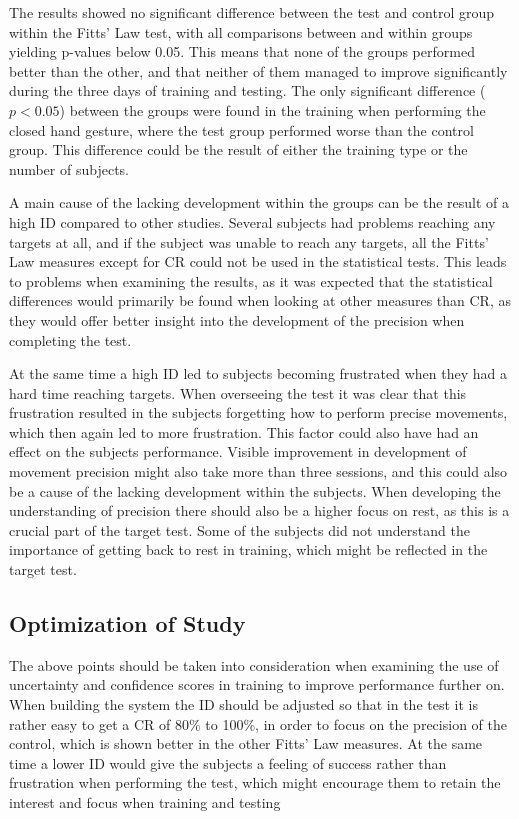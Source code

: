 The results showed no significant difference between the test and control group within the Fitts' Law test, with all comparisons between and within groups yielding p-values below 0.05. This means that none of the groups performed better than the other, and that neither of them managed to improve significantly during the three days of training and testing. The only significant difference ($p < 0.05$) between the groups were found in the training when performing the closed hand gesture, where the test group performed worse than the control group. This difference could be the result of either the training type or the number of subjects.

A main cause of the lacking development within the groups can be the result of a high ID compared to other studies. Several subjects had problems reaching any targets at all, and if the subject was unable to reach any targets, all the Fitts' Law measures except for CR could not be used in the statistical tests. This leads to problems when examining the results, as it was expected that the statistical differences would primarily be found when looking at other measures than CR, as they would offer better insight into the development of the precision when completing the test. 

At the same time a high ID led to subjects becoming frustrated when they had a hard time reaching targets. When overseeing the test it was clear that this frustration resulted in the subjects forgetting how to perform precise movements, which then again led to more frustration. This factor could also have had an effect on the subjects performance. Visible improvement in development of movement precision might also take more than three sessions, and this could also be a cause of the lacking development within the subjects. When developing the understanding of precision there should also be a higher focus on rest, as this is a crucial part of the target test. Some of the subjects did not understand the importance of getting back to rest in training, which might be reflected in the target test.

\subsection{Optimization of Study}
The above points should be taken into consideration when examining the use of uncertainty and confidence scores in training to improve performance further on. When building the system the ID should be adjusted so that in the test it is rather easy to get a CR of 80\% to 100\%, in order to focus on the precision of the control, which is shown better in the other Fitts' Law measures. At the same time a lower ID would give the subjects a feeling of success rather than frustration when performing the test, which might encourage them to retain the interest and focus when training and testing

